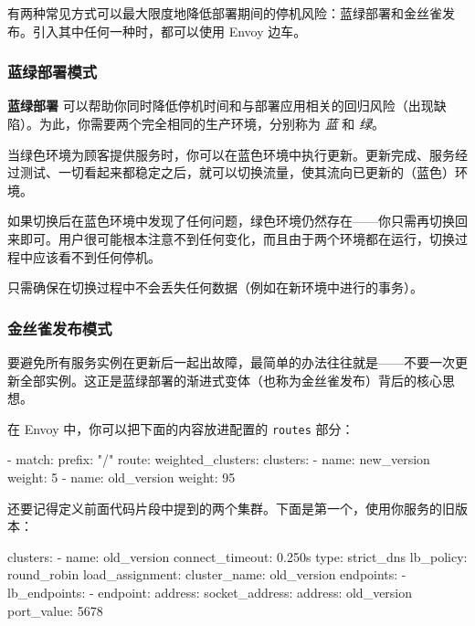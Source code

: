 \label{idx:418}
有两种常见方式可以最大限度地降低部署期间的停机风险：蓝绿部署和金丝雀发布。引入其中任何一种时，都可以使用 Envoy 边车。

\subsubsection{蓝绿部署模式}

\label{idx:419}
\textbf{蓝绿部署} 可以帮助你同时降低停机时间和与部署应用相关的回归风险（出现缺陷）。为此，你需要两个完全相同的生产环境，分别称为 \emph{蓝} 和 \emph{绿}。

\label{idx:420}
当绿色环境为顾客提供服务时，你可以在蓝色环境中执行更新。更新完成、服务经过测试、一切看起来都稳定之后，就可以切换流量，使其流向已更新的（蓝色）环境。

\label{idx:421}
如果切换后在蓝色环境中发现了任何问题，绿色环境仍然存在——你只需再切换回来即可。用户很可能根本注意不到任何变化，而且由于两个环境都在运行，切换过程中应该看不到任何停机。


\label{idx:422}
只需确保在切换过程中不会丢失任何数据（例如在新环境中进行的事务）。

\subsubsection{金丝雀发布模式}

\label{idx:423}
\label{idx:424}
要避免所有服务实例在更新后一起出故障，最简单的办法往往就是——不要一次更新全部实例。这正是蓝绿部署的渐进式变体（也称为金丝雀发布）背后的核心思想。


在 Envoy 中，你可以把下面的内容放进配置的 \texttt{routes} 部分：

\begin{codebox}[yaml]
- match:
    prefix: "/"
  route:
    weighted_clusters:
      clusters:
      - name: new_version
        weight: 5
      - name: old_version
        weight: 95
\end{codebox}

\label{idx:425}
\label{idx:426}
还要记得定义前面代码片段中提到的两个集群。下面是第一个，使用你服务的旧版本：

\begin{codebox}[yaml]
clusters:
  - name: old_version
    connect_timeout: 0.250s
    type: strict_dns
    lb_policy: round_robin
    load_assignment:
      cluster_name: old_version
      endpoints:
        - lb_endpoints:
            - endpoint:
                address:
                  socket_address:
                    address: old_version
                    port_value: 5678
\end{codebox}


